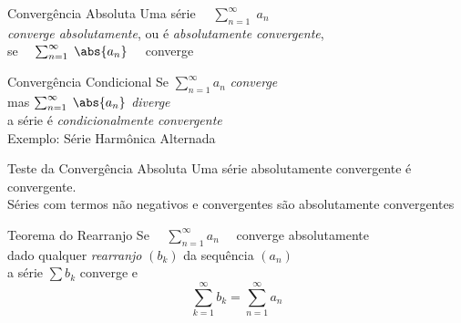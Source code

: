 \documentclass[fleqn,utf8,aspectratio=169,12pt]{beamer}
\begin{document}
\begin{frame}{Convergência Absoluta}
  Uma série
  \(\quad \sum_{n=1}^{\infty}\; a_n\) \\[5mm]
  \pause
  \emph{converge absolutamente}, ou é \emph{absolutamente convergente}, \\[5mm]
  \pause
  se
  \(\quad\sum_{n=1}^{\infty} \;\abs{a_n} \quad\) converge
\end{frame}

\begin{frame}{Convergência Condicional}
  Se  \tabto{12mm} \(\sum_{n=1}^{\infty} a_n\)          \tabto{32mm} \emph{converge} \\[9mm]
  \pause
  mas \tabto{12mm} \(\sum_{n=1}^{\infty} \;\abs{a_n} \) \tabto{32mm} \emph{diverge}  \\[9mm]
  \pause
  a série é \emph{condicionalmente convergente} \\[9mm]
  \pause
  Exemplo: Série Harmônica Alternada
\end{frame}

\begin{frame}{Teste da Convergência Absoluta}
  Uma série absolutamente convergente é convergente.\\[3mm]

  \pause
  \vspace{\baselineskip}
  Séries com termos não negativos e convergentes
  são absolutamente convergentes
\end{frame}

\begin{frame}{Teorema do Rearranjo}
Se \(\quad\sum_{n=1}^{\infty} a_n \quad \) converge absolutamente \\[5mm]

\pause
dado qualquer \emph{rearranjo} $(b_k)$ da sequência $(a_n)$ \\[5mm]

\pause
a série $\sum b_k$ converge e
\[
  \sum_{k=1}^{\infty} b_k = \sum_{n=1}^{\infty} a_n
\]
\end{frame}
\end{document}

